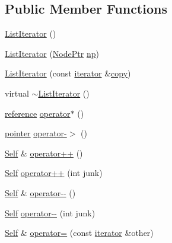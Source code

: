 \subsection*{Public Member Functions}
\begin{DoxyCompactItemize}
\item 
\hyperlink{structprism_1_1_list_iterator_ad5a2b076f9058f59aa58f09f8235621f}{List\+Iterator} ()
\item 
\hyperlink{structprism_1_1_list_iterator_a50a3be2e55ef7695cde4b75c7101c7d1}{List\+Iterator} (\hyperlink{structprism_1_1_list_iterator_aad2175a44d3db4fd84059ae15158b174}{Node\+Ptr} \hyperlink{structprism_1_1_list_iterator_a62ec8f8f950cd91c3cde64ce4d512136}{np})
\item 
\hyperlink{structprism_1_1_list_iterator_a744895dbd237f0cf742182230730b4ea}{List\+Iterator} (const \hyperlink{structprism_1_1_list_iterator_a91ccdd8512cbc8314d784e39ed4597dd}{iterator} \&\hyperlink{namespaceprism_ae776f4cd825f79e7af1cf6ee1d90a209}{copy})
\item 
virtual \hyperlink{structprism_1_1_list_iterator_ad58e903d2fb9ca5cec0545ee91f97d75}{$\sim$\+List\+Iterator} ()
\item 
\hyperlink{structprism_1_1_list_iterator_a8a07c86e6d1ef38b0f7d390ad7c05c22}{reference} \hyperlink{structprism_1_1_list_iterator_a851b954b9ed4d8333732afa957e64453}{operator$\ast$} ()
\item 
\hyperlink{structprism_1_1_list_iterator_adb94db3cc26f2df6b6962b756b6fa3c3}{pointer} \hyperlink{structprism_1_1_list_iterator_a02657b7672b110e21fff2954bd35cd7d}{operator-\/$>$} ()
\item 
\hyperlink{structprism_1_1_list_iterator_a54dfed5d1937a612aa2ae524b55f8087}{Self} \& \hyperlink{structprism_1_1_list_iterator_a409d9ec07abc792892a30cb0f8fbcedb}{operator++} ()
\item 
\hyperlink{structprism_1_1_list_iterator_a54dfed5d1937a612aa2ae524b55f8087}{Self} \hyperlink{structprism_1_1_list_iterator_a3ab6cd39734dbb8823b7ee937775e4bc}{operator++} (int junk)
\item 
\hyperlink{structprism_1_1_list_iterator_a54dfed5d1937a612aa2ae524b55f8087}{Self} \& \hyperlink{structprism_1_1_list_iterator_a2f8b0b1d62c4d74bcf02188447b9271a}{operator-\/-\/} ()
\item 
\hyperlink{structprism_1_1_list_iterator_a54dfed5d1937a612aa2ae524b55f8087}{Self} \hyperlink{structprism_1_1_list_iterator_afbf6f32574a6d8af4c2edeb9fe469807}{operator-\/-\/} (int junk)
\item 
\hyperlink{structprism_1_1_list_iterator_a54dfed5d1937a612aa2ae524b55f8087}{Self} \& \hyperlink{structprism_1_1_list_iterator_a34aa12598229b52e58dc5c3a2762bcbf}{operator=} (const \hyperlink{structprism_1_1_list_iterator_a91ccdd8512cbc8314d784e39ed4597dd}{iterator} \&other)

\end{DoxyCompactItemize}

